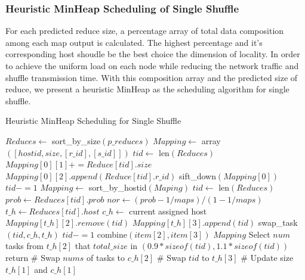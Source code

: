 \documentclass[10pt,twocolumn]{article}
\begin{document}
\subsubsection{Heuristic MinHeap Scheduling of Single Shuffle}
For each predicted reduce size, a percentage array of total data composition among each map output is calculated. The highest percentage and it's corresponding host shoudle be the best choice the dimension of locality. In order to achieve the uniform load on each node while reducing the network traffic and shuffle transmission time. With this composition array and the predicted size of reduce, we present a heuristic MinHeap as the scheduling algorithm for single shuffle.
\begin{minipage}{\linewidth}
\begin{algorithm}[H]
\caption{Heuristic MinHeap Scheduling for Single Shuffle}
\label{hminheap}
	\begin{algorithmic}[1]
		\State $Reduces\gets$ sort\_by\_size$\left(p\_reduces\right)$
		\State $Mapping\gets$ array$\left(\left[hostid, size, \left[r\_id\right], \left[s\_id\right]\right]\right)$
		\State $tid\gets$ len$\left(Reduces\right)$
		\State $Mapping\left[0\right]\left[1\right] += Reduce\left[tid\right].size$
		\State $Mapping\left[0\right]\left[2\right].append\left(Reduce\left[tid\right].r\_id\right)$
		\State sift\_down$\left(Mapping\left[0\right]\right)$
		\State $tid -= 1$
		\EndWhile
		\State $Mapping\gets$ sort\_by\_hostid$\left(Maping\right)$
		\State $tid\gets$ len$\left(Reduces\right)$
		\State $prob\gets Reduces\left[tid\right].prob$
		\State $nor\gets \left(prob-1/maps\right)/\left(1-1/maps\right)$
		\State $t\_h\gets Reduces\left[tid\right].host$
		\State $c\_h\gets$ current assigned host
			\State $Mapping\left[t\_h\right]\left[2\right].remove\left(tid\right)$
			\State $Mapping\left[t\_h\right]\left[3\right].append\left(tid\right)$
			\State swap\_task$\left(tid, c\_h, t\_h\right)$
		\Else
			\State {}
		\EndIf
		\State $tid -= 1$
		\EndWhile
			\State combine$\left(item\left[2\right], item\left[3\right]\right)$
		\EndFor
		\Return $Mapping$
	\EndProcedure
	\State Select $num$ tasks from $t\_h\left[2\right]$
	\State that $total\_size$ in 
	\State $\left(0.9*sizeof\left(tid\right), 1.1*sizeof\left(tid\right)\right)$
		\State return
	\Else
		\State \# Swap $nums$ of tasks to $c\_h\left[2\right]$
		\State \# Swap $tid$ to $t\_h\left[3\right]$
		\State \# Update size $t\_h\left[1\right]$ and $c\_h\left[1\right]$
	\EndIf
	\EndProcedure
	\end{algorithmic}
\end{algorithm}
\end{minipage}
\end{document}
